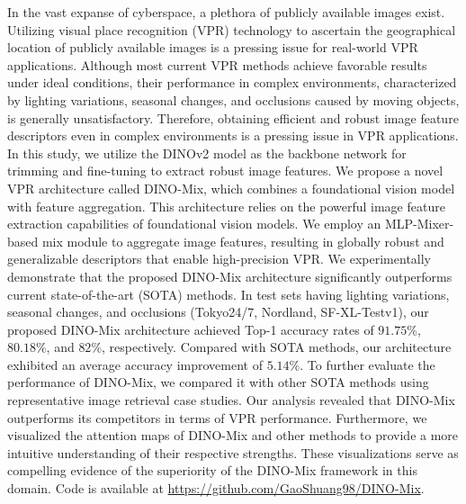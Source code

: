 In the vast expanse of cyberspace, a plethora of publicly available images exist. Utilizing visual place recognition (VPR) technology to ascertain the geographical location of publicly available images is a pressing issue for real-world VPR applications. Although most current VPR methods achieve favorable results under ideal conditions, their performance in complex environments, characterized by lighting variations, seasonal changes, and occlusions caused by moving objects, is generally unsatisfactory. Therefore, obtaining efficient and robust image feature descriptors even in complex environments is a pressing issue in VPR applications. In this study, we utilize the DINOv2 model as the backbone network for trimming and fine-tuning to extract robust image features. We propose a novel VPR architecture called DINO-Mix, which combines a foundational vision model with feature aggregation. This architecture relies on the powerful image feature extraction capabilities of foundational vision models. We employ an MLP-Mixer-based mix module to aggregate image features, resulting in globally robust and generalizable descriptors that enable high-precision VPR. We experimentally demonstrate that the proposed DINO-Mix architecture significantly outperforms current state-of-the-art (SOTA) methods. In test sets having lighting variations, seasonal changes, and occlusions (Tokyo24/7, Nordland, SF-XL-Testv1), our proposed DINO-Mix architecture achieved Top-1 accuracy rates of $91.75\%$, $80.18\%$, and $82\%$, respectively. Compared with SOTA methods, our architecture exhibited an average accuracy improvement of $5.14\%$. To further evaluate the performance of DINO-Mix, we compared it with other SOTA methods using representative image retrieval case studies. Our analysis revealed that DINO-Mix outperforms its competitors in terms of VPR performance. Furthermore, we visualized the attention maps of DINO-Mix and other methods to provide a more intuitive understanding of their respective strengths. These visualizations serve as compelling evidence of the superiority of the DINO-Mix framework in this domain. Code is available at \url{https://github.com/GaoShuang98/DINO-Mix}.
